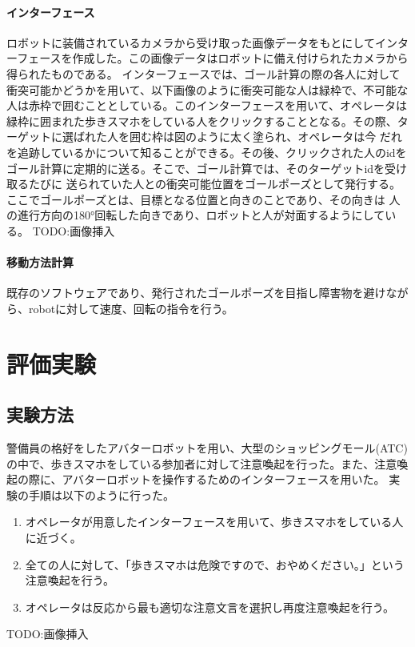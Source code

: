 \documentclass[11pt,a4j]{jreport}
\begin{document}
\subsubsection{インターフェース}
ロボットに装備されているカメラから受け取った画像データをもとにしてインターフェースを作成した。この画像データはロボットに備え付けられたカメラから得られたものである。
インターフェースでは、ゴール計算の際の各人に対して衝突可能かどうかを用いて、以下画像のように衝突可能な人は緑枠で、不可能な人は赤枠で囲むこととしている。このインターフェースを用いて、オペレータは
緑枠に囲まれた歩きスマホをしている人をクリックすることとなる。その際、ターゲットに選ばれた人を囲む枠は図のように太く塗られ、オペレータは今
だれを追跡しているかについて知ることができる。その後、クリックされた人のidをゴール計算に定期的に送る。そこで、ゴール計算では、そのターゲットidを受け取るたびに
送られていた人との衝突可能位置をゴールポーズとして発行する。ここでゴールポーズとは、目標となる位置と向きのことであり、その向きは
人の進行方向の180°回転した向きであり、ロボットと人が対面するようにしている。
TODO:画像挿入

\subsubsection{移動方法計算}
既存のソフトウェアであり、発行されたゴールポーズを目指し障害物を避けながら、robotに対して速度、回転の指令を行う。



\chapter{評価実験}
\section{実験方法}
警備員の格好をしたアバターロボットを用い、大型のショッピングモール(ATC)の中で、歩きスマホをしている参加者に対して注意喚起を行った。また、注意喚起の際に、アバターロボットを操作するためのインターフェースを用いた。
実験の手順は以下のように行った。
\begin{enumerate}
  \item オペレータが用意したインターフェースを用いて、歩きスマホをしている人に近づく。
  \item 全ての人に対して、「歩きスマホは危険ですので、おやめください。」という注意喚起を行う。
  \item オペレータは反応から最も適切な注意文言を選択し再度注意喚起を行う。
\end{enumerate}
TODO:画像挿入
\end{document}
